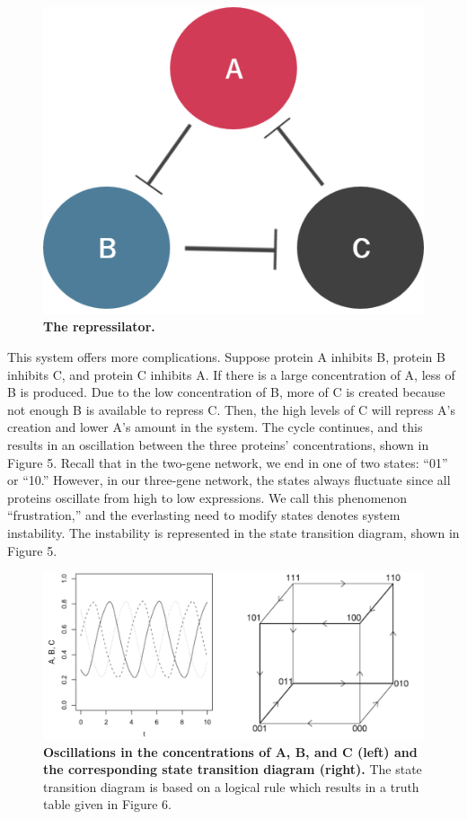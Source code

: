 \documentclass[11pt]{article}
\begin{document}
\begin{figure}[H]
\centering
\includegraphics[scale=0.4]{figure4}
\caption{\textbf{The repressilator.}}
\end{figure}

This system offers more complications. Suppose protein A inhibits B, protein B inhibits C, and protein C inhibits A. If there is a large concentration of A, less of B is produced. Due to the low concentration of B, more of C is created because not enough B is available to repress C. Then, the high levels of C will repress A’s creation and lower A’s amount in the system. The cycle continues, and this results in an oscillation between the three proteins’ concentrations, shown in Figure 5. Recall that in the two-gene network, we end in one of two states: “01”  or “10.” However, in our three-gene network, the states always fluctuate since all proteins oscillate from high to low expressions. We call this phenomenon “frustration,” and the everlasting need to modify states denotes system instability. The instability is represented in the state transition diagram, shown in Figure 5.

\begin{figure}[H]
\centering
\includegraphics[scale=0.4]{figure5}
\caption{\textbf{Oscillations in the concentrations of A, B, and C (left) and the corresponding state transition diagram (right).} The state transition diagram is based on a logical rule which results in a truth table given in Figure 6. }
\end{figure}
\end{document}
